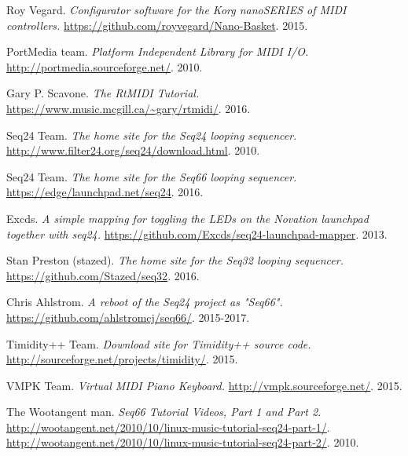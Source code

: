 {\begin{thebibliography}{99}
   Roy Vegard.
   \emph{Configurator software for the Korg nanoSERIES of MIDI controllers.}
   \url{https://github.com/royvegard/Nano-Basket}.
   2015.

   PortMedia team.
   \emph{Platform Independent Library for MIDI I/O.}
   \url{http://portmedia.sourceforge.net/}.
   2010.

   Gary P. Scavone.
   \emph{The RtMIDI Tutorial.}
   \url{https://www.music.mcgill.ca/~gary/rtmidi/}.
   2016.

   Seq24 Team.
   \emph{The home site for the Seq24 looping sequencer.}
   \url{http://www.filter24.org/seq24/download.html}.
   2010.

   Seq24 Team.
   \emph{The home site for the Seq66 looping sequencer.}
   \url{https://edge/launchpad.net/seq24}.
   2016.

   Excds.
   \emph{A simple mapping for toggling the LEDs on the Novation launchpad
   together with seq24.}
   \url{https://github.com/Excds/seq24-launchpad-mapper}.
   2013.

   Stan Preston (stazed).
   \emph{The home site for the Seq32 looping sequencer.}
   \url{https://github.com/Stazed/seq32}.
   2016.

   Chris Ahlstrom.
   \emph{A reboot of the Seq24 project as "Seq66".}
   \url{https://github.com/ahlstromcj/seq66/}.
   2015-2017.

   Timidity++ Team.
   \emph{Download site for Timidity++ source code.}
   \url{http://sourceforge.net/projects/timidity/}.
   2015.

   VMPK Team.
   \emph{Virtual MIDI Piano Keyboard.}
   \url{http://vmpk.sourceforge.net/}.
   2015.

   The Wootangent man.
   \emph{Seq66 Tutorial Videos, Part 1 and Part 2.}
   \url{http://wootangent.net/2010/10/linux-music-tutorial-seq24-part-1/}.
   \url{http://wootangent.net/2010/10/linux-music-tutorial-seq24-part-2/}.
   2010.

\end{thebibliography}
}

